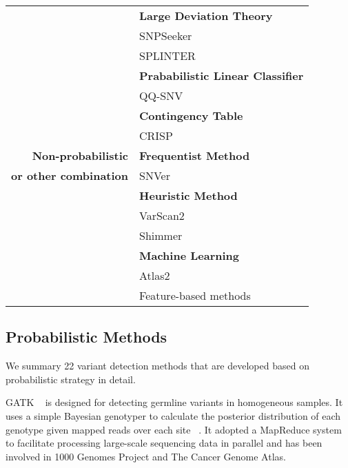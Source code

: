 \documentclass[11pt,reqno]{amsart}
\begin{document}
\begin{table}[htbp]
\begin{tabular}{rr}
          & \multicolumn{1}{l}{\textbf{Large Deviation Theory}} \\
          & \multicolumn{1}{l}{\quad SNPSeeker} \\
          & \multicolumn{1}{l}{\quad SPLINTER} \\
          & \multicolumn{1}{l}{\textbf{Prababilistic Linear Classifier }} \\
          & \multicolumn{1}{l}{\quad QQ-SNV} \\
          & \multicolumn{1}{l}{\textbf{Contingency Table }} \\
          & \multicolumn{1}{l}{\quad CRISP} \\
          \midrule
    \textbf{Non-probabilistic} & \multicolumn{1}{l}{\textbf{Frequentist Method}} \\
    \textbf{or other combination} & \multicolumn{1}{l}{\quad SNVer} \\
         & \multicolumn{1}{l}{\textbf{Heuristic Method}} \\
         & \multicolumn{1}{l}{\quad VarScan2} \\
         & \multicolumn{1}{l}{\quad Shimmer} \\
         & \multicolumn{1}{l}{\textbf{Machine Learning}} \\
         & \multicolumn{1}{l}{\quad Atlas2} \\
         & \multicolumn{1}{l}{\quad Feature-based methods} \\
    \bottomrule
    \end{tabular}
\end{table}


\subsection{Probabilistic Methods}
We summary 22 variant detection methods that are developed based on probabilistic strategy in detail.

GATK ~\citep{McKenna2010} is designed for detecting germline variants in homogeneous samples.
It uses a simple Bayesian genotyper to calculate the posterior distribution of each genotype given mapped reads over each site ~\citep{depristo2011framework}.
It adopted a MapReduce system to facilitate processing large-scale sequencing data in parallel and has been involved in 1000 Genomes Project and The Cancer Genome Atlas.
\end{document}
